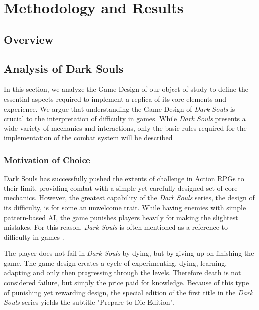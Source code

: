 \chapter{Methodology and Results}



\section{Overview}






\label{sec:analysis-dark-souls}
\section{Analysis of Dark Souls}

In this section, we analyze the Game Design of our object of study to define the essential aspects required to implement a replica of its core elements and experience. We argue that understanding the Game Design of \emph{Dark Souls} is crucial to the interpretation of difficulty in games. While \emph{Dark Souls} presents a wide variety of mechanics and interactions, only the basic rules required for the implementation of the combat system will be described.

\subsection{Motivation of Choice}

Dark Souls has successfully pushed the extents of challenge in Action RPGs to their limit, providing combat with a simple yet carefully designed set of core mechanics. However, the greatest capability of the \emph{Dark Souls} series, the design of its difficulty, is for some an unwelcome trait. While having enemies with simple pattern-based AI, the game punishes players heavily for making the slightest mistakes. For this reason, \emph{Dark Souls} is often mentioned as a reference to difficulty in games \cite{URL_ExploringDesignOfDarkSouls}.

The player does not fail in \emph{Dark Souls} by dying, but by giving up on finishing the game. The game design creates a cycle of experimenting, dying, learning, adapting and only then progressing through the levels. Therefore death is not considered failure, but simply the price paid for knowledge. Because of this type of punishing yet rewarding design, the special edition of the first title in the \emph{Dark Souls} series yields the subtitle "Prepare to Die Edition".

